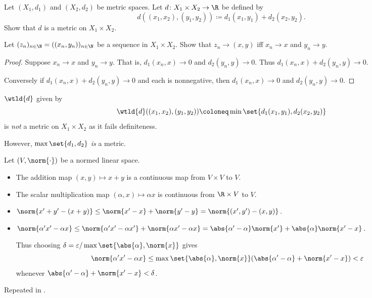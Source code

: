 \begin{exercise}
    Let $(X_1, d_1)$ and $(X_2, d_2)$ be metric spaces.
    Let $d\colon X_1 \times X_2 \to \R$ be defined by \[
        d((x_1, x_2), (y_1, y_2)) \coloneq d_1(x_1, y_1) + d_2(x_2, y_2).
    \] Show that $d$ is a metric on $X_1 \times X_2$.

    Let $(z_n)_{n \in \N} = ((x_n, y_n))_{n \in \N}$ be a sequence in
    $X_1 \times X_2$.
    Show that $z_n \to (x, y)$ iff $x_n \to x$ and $y_n \to y$.
\end{exercise}
\begin{proof}
    Suppose $x_n \to x$ and $y_n \to y$.
    That is, $d_1(x_n, x) \to 0$ and $d_2(y_n, y) \to 0$.
    Thus $d_1(x_n, x) + d_2(y_n, y) \to 0$.

    Conversely if $d_1(x_n, x) + d_2(y_n, y) \to 0$ and each is nonnegative,
    then $d_1(x_n, x) \to 0$ and $d_2(y_n, y) \to 0$.
\end{proof}

\begin{remark}
    $\wtld{d}$ given by \[
        \wtld{d}((x_1, x_2), (y_1, y_2)) \coloneq
            \min\set{d_1(x_1, y_1), d_2(x_2, y_2)}
    \] is \emph{not} a metric on $X_1 \times X_2$ as it fails definiteness.

    However, $\max\set{d_1, d_2}$ \emph{is} a metric.
\end{remark}

\begin{exercise}
    Let $(V, \norm{\cdot})$ be a normed linear space.
    \begin{itemize}
        \item The addition map $(x, y) \mapsto x + y$ is a continuous map
        from $V \times V$ to $V$.
        \item The scalar multiplication map $(\alpha, x) \mapsto \alpha x$
        is continuous from $\R \times V$ to $V$.
    \end{itemize}
\end{exercise}
\begin{solution} \leavevmode
    \begin{itemize}
        \item $\norm{x' + y' - (x + y)} \le \norm{x' - x} + \norm{y' - y}
        = \norm{(x', y') - (x, y)}$.
        \item $\norm{\alpha' x' - \alpha x} \le \norm{\alpha' x' - \alpha x'}
        + \norm{\alpha x' - \alpha x} = \abs{\alpha' - \alpha} \norm{x'}
        + \abs{\alpha} \norm{x' - x}$.

        Thus choosing $\delta = \varepsilon / \max\set{\abs{\alpha}, \norm{x}}$
        gives \[
            \norm{\alpha' x' - \alpha x} \le \max\set{\abs{\alpha}, \norm{x}}
                (\abs{\alpha' - \alpha} + \norm{x' - x}) < \varepsilon
        \] whenever $\abs{\alpha' - \alpha} + \norm{x' - x} < \delta$.
    \end{itemize}
    Repeated in .
\end{solution}

